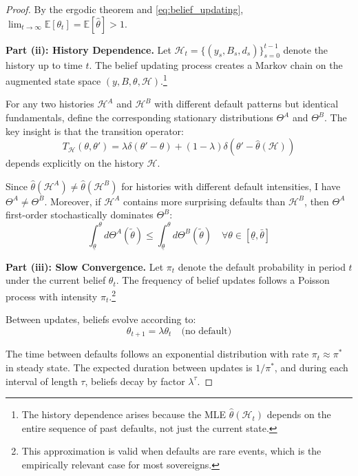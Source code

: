 \documentclass[12pt]{article}
\theoremstyle{plain}
\begin{document}
\begin{proof}
	By the ergodic theorem and \eqref{eq:belief_updating}, $\lim_{t \to \infty}
		\mathbb{E}[\theta_t] = \mathbb{E}[\hat{\theta}] > 1$.

	\textbf{Part (ii): History Dependence.}
	Let $\mathcal{H}_t = \{(y_s, B_s, d_s)\}_{s=0}^{t-1}$ denote the history up to time $t$. The belief updating process creates a Markov chain on the augmented state space $(y, B, \theta, \mathcal{H})$.\footnote{The history dependence arises because the MLE $\hat{\theta}(\mathcal{H}_t)$ depends on the entire sequence of past defaults, not just the current state.}

	For any two histories $\mathcal{H}^A$ and $\mathcal{H}^B$ with different
	default patterns but identical fundamentals, define the corresponding
	stationary distributions $\Theta^A$ and $\Theta^B$. The key insight is that the
	transition operator:
	\begin{equation}
		T_{\mathcal{H}}(\theta, \theta') = \lambda \delta(\theta' - \theta) + (1-\lambda) \delta(\theta' - \hat{\theta}(\mathcal{H}))
		\label{eq:transition_operator}
	\end{equation}
	depends explicitly on the history $\mathcal{H}$.

	Since $\hat{\theta}(\mathcal{H}^A) \neq \hat{\theta}(\mathcal{H}^B)$ for
histories with different default intensities, I have $\Theta^A \neq \Theta^B$.
	Moreover, if $\mathcal{H}^A$ contains more surprising defaults than
	$\mathcal{H}^B$, then $\Theta^A$ first-order stochastically dominates
	$\Theta^B$:
	\begin{equation}
		\int_{\underline{\theta}}^{\theta} d\Theta^A(\tilde{\theta}) \leq \int_{\underline{\theta}}^{\theta} d\Theta^B(\tilde{\theta}) \quad \forall \theta \in [\underline{\theta}, \bar{\theta}] \label{eq:stochastic_dominance}
	\end{equation}

	\textbf{Part (iii): Slow Convergence.}
	Let $\pi_t$ denote the default probability in period $t$ under the current belief $\theta_t$. The frequency of belief updates follows a Poisson process with intensity $\pi_t$.\footnote{This approximation is valid when defaults are rare events, which is the empirically relevant case for most sovereigns.}

	Between updates, beliefs evolve according to:
	\begin{equation}
		\theta_{t+1} = \lambda \theta_t \quad \text{(no default)} \label{eq:belief_decay}
	\end{equation}

	The time between defaults follows an exponential distribution with rate $\pi_t
		\approx \pi^*$ in steady state. The expected duration between updates is
	$1/\pi^*$, and during each interval of length $\tau$, beliefs decay by factor
	$\lambda^\tau$.


\end{proof}
\end{document}
